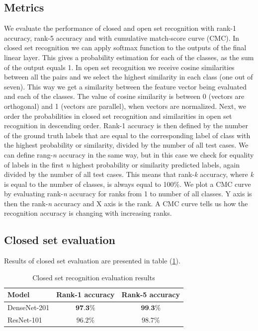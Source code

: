 \documentclass[9pt]{IEEEtran}
\begin{document}
\subsection{Metrics}
We evaluate the performance of closed and open set recognition with rank-1 accuracy, rank-5 accuracy and with cumulative match-score curve (CMC). In closed set recognition we can apply softmax function to the outputs of the final linear layer. This gives a probability estimation for each of the classes, as the sum of the output equals 1. In open set recognition we receive cosine similarities between all the pairs and we select the highest similarity in each class (one out of seven). This way we get a similarity between the feature vector being evaluated and each of the classes. The value of cosine similarity is between 0 (vectors are orthogonal) and 1 (vectors are parallel), when vectors are normalized. Next, we order the probabilities in closed set recognition and similarities in open set recognition in descending order. Rank-1 accuracy is then defined by the number of the ground truth labels that are equal to the corresponding label of class with the highest probability or similarity, divided by the number of all test cases. We can define rang-\textit{n} accuracy in the same way, but in this case we check for equality of labels in the first \textit{n} highest probability or similarity predicted labels, again divided by the number of all test cases. This means that rank-\textit{k} accuracy, where \textit{k} is equal to the number of classes, is always equal to 100\%. We plot a CMC curve by evaluating rank-\textit{n} accuracy for ranks from 1 to number of all classes. Y axis is then the rank-\textit{n} accuracy and X axis is the rank. A CMC curve tells us how the recognition accuracy is changing with increasing ranks.

\subsection{Closed set evaluation}
Results of closed set evaluation are presented in table (\ref{tab:results-closed}).

\begin{table}[h]
    \centering
    \caption{Closed set recognition evaluation results}
    \def\arraystretch{1.3}
    \begin{tabular}{ l | c | c} 
        Model & Rank-1 accuracy & Rank-5 accuracy \\
        \hline
        DenseNet-201 & $\textbf{97.3\%}$ & $\textbf{99.3\%}$ \\
        \hline
        ResNet-101 & $96.2\%$ & $98.7\%$ \\
    \end{tabular}
    \label{tab:results-closed}
\end{table}
\end{document}
